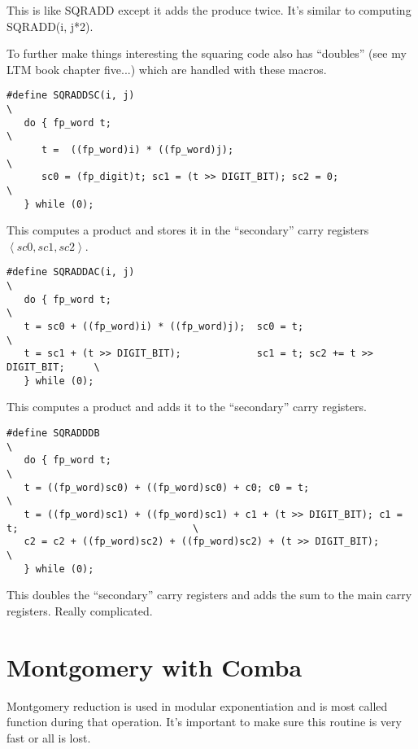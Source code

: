\documentclass[b5paper]{book}
\begin{document}
This is like SQRADD except it adds the produce twice.  It's similar to 
computing SQRADD(i, j*2).

To further make things interesting the squaring code also has ``doubles'' (see my LTM book chapter five...) which are
handled with these macros.

\begin{verbatim}
#define SQRADDSC(i, j)                                                         \
   do { fp_word t;                                                             \
      t =  ((fp_word)i) * ((fp_word)j);                                        \
      sc0 = (fp_digit)t; sc1 = (t >> DIGIT_BIT); sc2 = 0;                      \
   } while (0);
\end{verbatim}
This computes a product and stores it in the ``secondary'' carry registers $\left < sc0, sc1, sc2 \right >$.

\begin{verbatim}
#define SQRADDAC(i, j)                                                         \
   do { fp_word t;                                                             \
   t = sc0 + ((fp_word)i) * ((fp_word)j);  sc0 = t;                            \
   t = sc1 + (t >> DIGIT_BIT);             sc1 = t; sc2 += t >> DIGIT_BIT;     \
   } while (0);
\end{verbatim}
This computes a product and adds it to the ``secondary'' carry registers.

\begin{verbatim}
#define SQRADDDB                                                               \
   do { fp_word t;                                                             \
   t = ((fp_word)sc0) + ((fp_word)sc0) + c0; c0 = t;                                                 \
   t = ((fp_word)sc1) + ((fp_word)sc1) + c1 + (t >> DIGIT_BIT); c1 = t;                              \
   c2 = c2 + ((fp_word)sc2) + ((fp_word)sc2) + (t >> DIGIT_BIT);                                     \
   } while (0);
\end{verbatim}
This doubles the ``secondary'' carry registers and adds the sum to the main carry registers.  Really complicated.

\section{Montgomery with Comba}
Montgomery reduction is used in modular exponentiation and is most called function during
that operation.  It's important to make sure this routine is very fast or all is lost.
\end{document}
